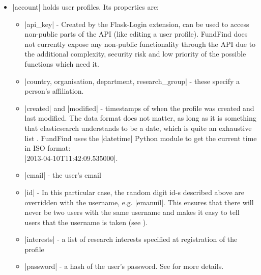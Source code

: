 \begin{itemize}
\item |account| holds user profiles. Its properties are:
	\begin{itemize}
	\item |api_key| - Created by the Flask-Login extension, can be used to access non-public parts of the API (like editing a user profile). FundFind does not currently expose any non-public functionality through the API due to the additional complexity, security risk and low priority of the possible functions which need it.
	\item |country, organisation, department, research_group| - these specify a person's affiliation.
	
	\item |created| and |modified| - timestamps of when the profile was created and last modified. The data format does not matter, as long as it is something that elasticsearch understands to be a date, which is quite an exhaustive list \cite{es-dateformat}. FundFind uses the |datetime| Python module to get the current time in ISO format: 
	\\ |2013-04-10T11:42:09.535000|.
	
	\item |email| - the user's email
	\item |id| - In this particular case, the random digit id-s described above are overridden with the username, e.g. |emanuil|. This ensures that there will never be two users with the same username and makes it easy to tell users that the username is taken (see ).
	\item |interests| - a list of research interests specified at registration of the profile
	\item |password| - a hash of the user's password. See  for more details.
	\end{itemize}


\end{itemize}
